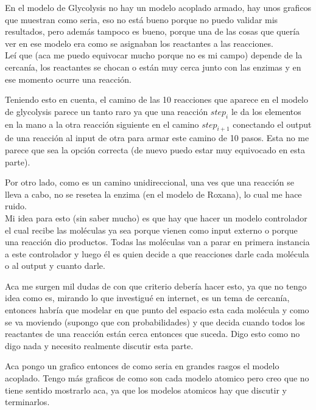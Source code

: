 \documentclass[12pt]{article}
\begin{document}
En el modelo de Glycolysis no hay un modelo acoplado armado, hay unos graficos que muestran como seria, eso no está bueno porque no puedo validar mis resultados, pero además tampoco es bueno, porque una de las cosas que quería ver en ese modelo era como se asignaban los reactantes a las reacciones. \\

Leí que (aca me puedo equivocar mucho porque no es mi campo) depende de la cercanía, los reactantes se chocan o están muy cerca junto con las enzimas y en ese momento ocurre una reacción.  

Teniendo esto en cuenta, el camino de las 10 reacciones que aparece en el modelo de glycolysis parece un tanto raro ya que una reacción $step_i$ le da los elementos en la mano a la otra reacción siguiente en el camino $step_{i+1}$ conectando el output de una reacción al input de otra para armar este camino de 10 pasos. Esta no me parece que sea la opción correcta (de nuevo puedo estar muy equivocado en esta parte).

Por otro lado, como es un camino unidireccional, una ves que una reacción se lleva a cabo, no se resetea la enzima (en el modelo de Roxana), lo cual me hace ruido. \\

Mi idea para esto (sin saber mucho) es que hay que hacer un modelo controlador el cual recibe las moléculas ya sea porque vienen como input externo o porque una reacción dio productos. Todas las moléculas van a parar en primera instancia a este controlador y luego él es quien decide a que reacciones darle cada molécula o al output y cuanto darle.

Aca me surgen mil dudas de con que criterio debería hacer esto, ya que no tengo idea como es, mirando lo que investigué en internet, es un tema de cercanía, entonces habría que modelar en que punto del espacio esta cada molécula y como se va moviendo (supongo que con probabilidades) y que decida cuando todos los reactantes de una reacción están cerca entonces que suceda. Digo esto como no digo nada y necesito realmente discutir esta parte.

\newpage
Aca pongo un grafico entonces de como seria en grandes rasgos el modelo acoplado. Tengo más graficos de como son cada modelo atomico pero creo que no tiene sentido mostrarlo aca, ya que los modelos atomicos hay que discutir y terminarlos.
\end{document}
